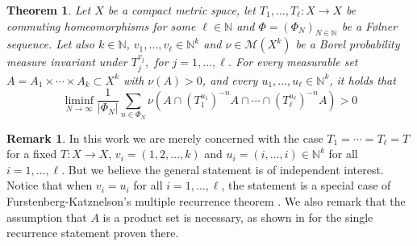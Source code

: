 \documentclass[letter, 11pt]{article}
\newtheorem{theo}{Theorem}[section]
\theoremstyle{definition}
\newtheorem*{remark*}{Remark}
\theoremstyle{plain}
\newcommand{\N}{\mathbb{N}}
\newcommand{\cM}{\mathcal{M}}
\newcommand{\1}{\mathbbm{1}}
\begin{document}
\begin{theo}\label{T-Delta-Furstenberg}
    Let $X$ be a compact metric space, let $T_1, \ldots, T_{\ell} \colon X \to X$ be commuting homeomorphisms for some $\ell \in \N$ and $\Phi = (\Phi_N)_{N \in \N}$ be a F\o lner sequence. Let also $k \in \N$, $v_1, \ldots, v_{\ell} \in \N^k$ and $\nu \in \cM(X^k)$ be a Borel probability measure invariant under $T_j^{v_j},$ for $j=1,\ldots,\ell$. For every measurable set $A = A_1 \times \cdots \times A_k \subset X^k$ with $\nu(A) >0$, and every $u_1, \ldots, u_{\ell} \in \N^k$, it holds that
    \begin{equation}
        \liminf_{N \to \infty} \frac{1}{|\Phi_N|} \sum_{n \in \Phi_N} \nu(A \cap (T^{u_1}_1)^{-n} A \cap \cdots \cap (T^{u_{\ell}}_{\ell})^{-n} A) >0 
    \end{equation}
\end{theo}
\begin{remark*}
    In this work we are merely concerned with the case $T_1 = \cdots = T_{\ell}  = T$ for a fixed $T \colon X \to X$, $v_i = (1, 2, \ldots, k)$ and $u_i = (i, \ldots, i) \in \N^k$ for all $i=1, \ldots, \ell$. But we believe the general statement is of independent interest. Notice that when $v_i = u_i$ for all $i=1, \ldots, \ell$, the statement is a special case of Furstenberg-Katznelson's multiple recurrence theorem \cite{Furstenberg_Katznelson78}. We also remark that the assumption that $A$ is a product set is necessary, as shown in \cite[Example $6.4$]{kmrr25} for the single recurrence statement proven there.
\end{remark*}
\end{document}
